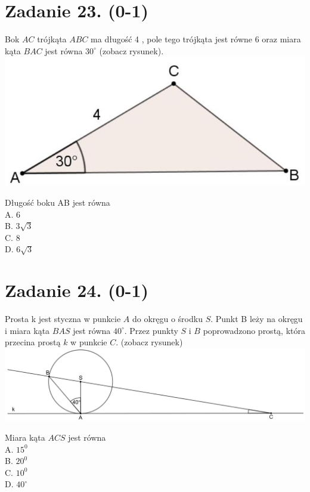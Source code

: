 \documentclass[10pt]{article}
\begin{document}
\section*{Zadanie 23. (0-1)}
Bok \(A C\) trójkąta \(A B C\) ma długość 4 , pole tego trójkąta jest równe 6 oraz miara kąta \(B A C\) jest równa \(30^{\circ}\) (zobacz rysunek).\\
\includegraphics[max width=\textwidth, center]{2024_11_21_fd555512e32c497e8a5dg-12}

Długość boku AB jest równa\\
A. 6\\
B. \(3 \sqrt{3}\)\\
C. 8\\
D. \(6 \sqrt{3}\)

\section*{Zadanie 24. (0-1)}
Prosta k jest styczna w punkcie \(A\) do okręgu o środku \(S\). Punkt B leży na okręgu i miara kąta \(B A S\) jest równa \(40^{\circ}\). Przez punkty \(S\) i \(B\) poprowadzono prostą, która przecina prostą \(k\) w punkcie \(C\). (zobacz rysunek)\\
\includegraphics[max width=\textwidth, center]{2024_11_21_fd555512e32c497e8a5dg-12(1)}

Miara kąta \(A C S\) jest równa\\
A. \(15^{0}\)\\
B. \(20^{0}\)\\
C. \(10^{0}\)\\
D. \(40^{\circ}\)
\end{document}
